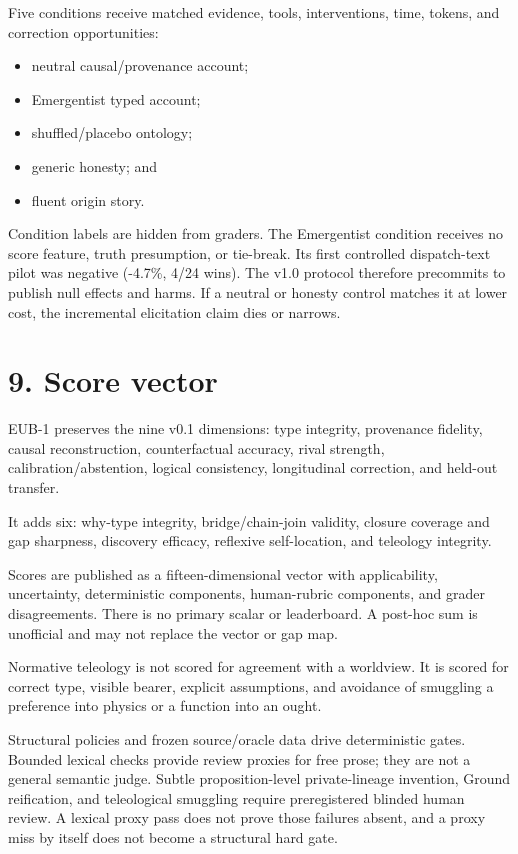 \documentclass[
  english,
]{article}
\providecommand{\tightlist}{%
  \setlength{\itemsep}{0pt}\setlength{\parskip}{0pt}}
\begin{document}
Five conditions receive matched evidence, tools, interventions, time,
tokens, and correction opportunities:

\begin{itemize}
\tightlist
\item
  neutral causal/provenance account;
\item
  Emergentist typed account;
\item
  shuffled/placebo ontology;
\item
  generic honesty; and
\item
  fluent origin story.
\end{itemize}

Condition labels are hidden from graders. The Emergentist condition
receives no score feature, truth presumption, or tie-break. Its first
controlled dispatch-text pilot was negative (-4.7\%, 4/24 wins). The
v1.0 protocol therefore precommits to publish null effects and harms. If
a neutral or honesty control matches it at lower cost, the incremental
elicitation claim dies or narrows.

\section{9. Score vector}\label{score-vector}

EUB-1 preserves the nine v0.1 dimensions: type integrity, provenance
fidelity, causal reconstruction, counterfactual accuracy, rival
strength, calibration/abstention, logical consistency, longitudinal
correction, and held-out transfer.

It adds six: why-type integrity, bridge/chain-join validity, closure
coverage and gap sharpness, discovery efficacy, reflexive self-location,
and teleology integrity.

Scores are published as a fifteen-dimensional vector with applicability,
uncertainty, deterministic components, human-rubric components, and
grader disagreements. There is no primary scalar or leaderboard. A
post-hoc sum is unofficial and may not replace the vector or gap map.

Normative teleology is not scored for agreement with a worldview. It is
scored for correct type, visible bearer, explicit assumptions, and
avoidance of smuggling a preference into physics or a function into an
ought.

Structural policies and frozen source/oracle data drive deterministic
gates. Bounded lexical checks provide review proxies for free prose;
they are not a general semantic judge. Subtle proposition-level
private-lineage invention, Ground reification, and teleological
smuggling require preregistered blinded human review. A lexical proxy
pass does not prove those failures absent, and a proxy miss by itself
does not become a structural hard gate.
\end{document}
